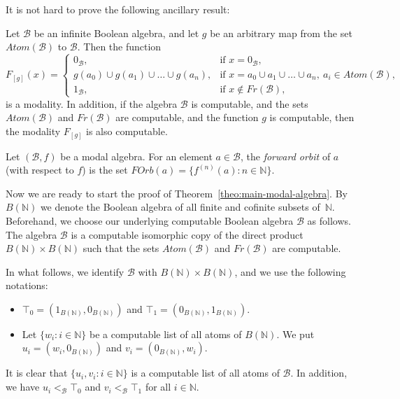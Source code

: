 \documentclass[a4paper,UKenglish,cleveref, autoref, thm-restate]{lipics-v2021}
\begin{document}
It is not hard to prove the following ancillary result: 

\begin{lemma}\label{lemma:modality-00}
	Let $\mathcal{B}$ be an infinite Boolean algebra, and let $g$ be an arbitrary map from the set $Atom(\mathcal{B})$ to $\mathcal{B}$. Then the function
	\[
		F_{[g]}(x) = \begin{cases}
			0_{\mathcal{B}}, & \text{if } x=0_{\mathcal{B}},\\
			g(a_0) \cup g(a_1) \cup \dots \cup g(a_n), & \text{if } x = a_0 \cup a_1 \cup \dots \cup a_n,\ a_i\in Atom(\mathcal{B}),\\
			1_{\mathcal{B}}, & \text{if } x\not\in Fr(\mathcal{B}),
		\end{cases}
	\]
	is a modality. In addition, if the algebra $\mathcal{B}$ is computable, and the sets $Atom(\mathcal{B})$ and $Fr(\mathcal{B})$ are computable, and the function $g$ is computable, then the modality $F_{[g]}$ is also computable.
\end{lemma}




\begin{definition}
	Let $(\mathcal{B}, f)$ be a modal algebra. For an element $a\in\mathcal{B}$, the \emph{forward orbit} of $a$ (with respect to $f$) is the set
	$
		FOrb(a) = \{ f^{(n)}(a) : n\in \mathbb{N} \}.
	$
\end{definition}





Now we are ready to start the proof of Theorem~\ref{theo:main-modal-algebra}. By $B({\mathbb{N}})$ we denote the Boolean algebra of all finite and cofinite subsets of~$\mathbb{N}$. 
Beforehand, we choose our underlying computable Boolean algebra $\mathcal{B}$ as follows. The algebra $\mathcal{B}$ is a computable isomorphic copy of the direct product $B(\mathbb{N}) \times B(\mathbb{N})$ such that the sets $Atom(\mathcal{B})$ and $Fr(\mathcal{B})$ are computable. 

In what follows, we identify $\mathcal{B}$ with $B(\mathbb{N}) \times B(\mathbb{N})$, and we use the following notations:
\begin{itemize}
	\item $\top_0 = (1_{B({\mathbb{N}})}, 0_{B({\mathbb{N}})})$ and $\top_1 = (0_{B(\mathbb{N})}, 1_{B(\mathbb{N})})$.
	
	\item Let $\{ w_i : {i\in\mathbb{N}} \}$ be a computable list of all atoms of $B(\mathbb{N})$. We put $u_i = (w_i, 0_{B(\mathbb{N})})$ and $v_i = (0_{B(\mathbb{N})}, w_i)$. 
\end{itemize}
It is clear that $\{u_i,v_i : i\in\mathbb{N} \}$ is a computable list of all atoms of $\mathcal{B}$. In addition, we have $u_i <_{\mathcal{B}} \top_0$ and $v_i <_{\mathcal{B}} \top_1$ for all $i\in\mathbb{N}$.
\end{document}
